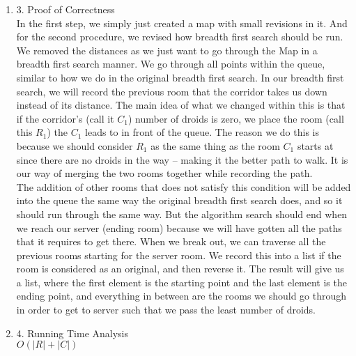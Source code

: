 \documentclass[11pt]{article}
\newenvironment{qparts}{\begin{enumerate}[{(}a{)}]}{\end{enumerate}}
\begin{document}
\begin{qparts}
\begin{verbatim}
  Q := a queue that contains rooms
  Q.insert(e) // put the room e inside the queue
  while Q is not empty:
    rm := Q.pop() 
    // assume pop() removes the first element in the queue, and returns it
    for all cor in C, such that cor.start() is rm:
      s1 := cor.end()
      if s1 is e:
        s1.previous() := rm
        exit the while-loop  
      if cor.numOfDroids is 0:
        // assume firstInsert(s1) will insert s1 into the front of the queue        
        Q.firstInsert(s1)
        s1.previous() := rm
      else: 
        s1.previous() := rm
        Q.insert(s1)
  paths := empty list of rooms
  while s is not e:
    if s.original():
      paths.insert(s)
    e := e.previous()
  paths.insert(e)
  paths.reverse() // reverses the list paths
  return paths
\end{verbatim}
\item[3.] Proof of Correctness \\
In the first step, we simply just created a map with small revisions in it. And for the second procedure, we revised how breadth first search should be run. We removed the distances as we just want to go through the Map in a breadth first search manner. We go through all points within the queue, similar to how we do in the original breadth first search. In our breadth first search, we will record the previous room that the corridor takes us down instead of its distance. The main idea of what we changed within this is that if the corridor's (call it $C_1$) number of droids is zero, we place the room (call this $R_1$) the $C_1$ leads to in front of the queue. The reason we do this is because we should consider $R_1$ as the same thing as the room $C_1$ starts at since there are no droids in the way -- making it the better path to walk. It is our way of merging the two rooms together while recording the path. \\

The addition of other rooms that does not satisfy this condition will be added into the queue the same way the original breadth first search does, and so it should run through the same way. But the algorithm search should end when we reach our server (ending room) because we will have gotten all the paths that it requires to get there. When we break out, we can traverse all the previous rooms starting for the server room. We record this into a list if the room is considered as an original, and then reverse it. The result will give us a list, where the first element is the starting point and the last element is the ending point, and everything in between are the rooms we should go through in order to get to server such that we pass the least number of droids. 
\item[4.] Running Time Analysis \\
$O(|R| + |C|)$ \\


\end{qparts}
\end{document}
